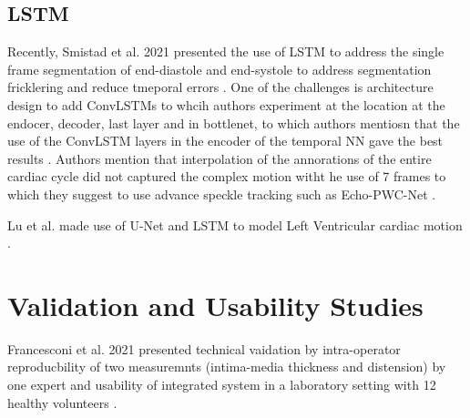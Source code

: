 



\subsection{LSTM}
Recently, Smistad et al. 2021 presented the use of LSTM to address the single frame segmentation of end-diastole and end-systole to address segmentation fricklering and reduce tmeporal errors \cite{smistad2021-C-IUS}.
One of the challenges is architecture design to add ConvLSTMs to whcih authors experiment at the location at the endocer, decoder, last layer and in bottlenet, to which authors mentiosn that the use of the ConvLSTM layers in the encoder of the temporal NN gave the best results \cite{smistad2021-C-IUS}.
Authors mention that interpolation of the annorations of the entire cardiac cycle did not captured the complex motion witht he use of 7 frames to which they suggest to use advance speckle tracking such as Echo-PWC-Net  \cite{ostvik2021-TMI}.

Lu et al. made use of U-Net and LSTM to model Left Ventricular cardiac motion \cite{lu2020-MIUA}.

\section{Validation and Usability Studies}
Francesconi et al. 2021 presented technical vaidation by intra-operator reproducbility of two measuremnts (intima-media thickness and distension) by one expert and usability of integrated system in a laboratory setting with 12 healthy volunteers \cite{francesconi2021}.


